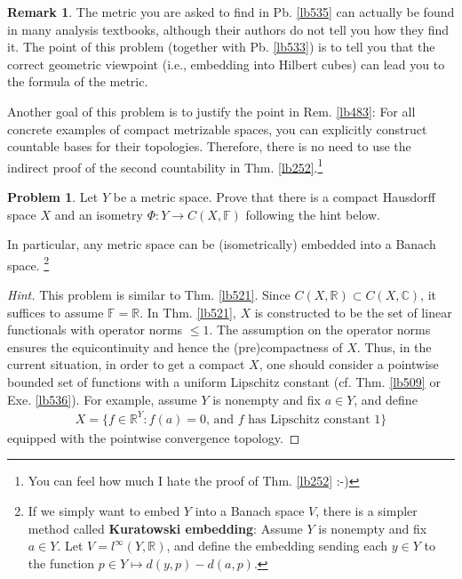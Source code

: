 \documentclass[12pt,b5paper,notitlepage]{article}
\theoremstyle{definition}
\newtheorem{exe}[df]{Exercise}
\newtheorem{rem}[df]{Remark}
\newtheorem{prob}{\color{red}Problem}[section]
\theoremstyle{plain}
\newcommand{\Cbb}{\mathbb C}
\newcommand{\Rbb}{\mathbb R}
\newcommand{\Fbb}{\mathbb F}
\numberwithin{equation}{section}
\begin{document}
\begin{rem}
The metric you are asked to find in Pb. \ref{lb535} can actually be found in many analysis textbooks, although their authors do not tell you how they find it. The point of this problem (together with Pb. \ref{lb533}) is to tell you that the correct geometric viewpoint (i.e., embedding into Hilbert cubes) can lead you to the formula of the metric. 

Another goal of this problem is to justify the point in Rem. \ref{lb483}: For all concrete examples of compact metrizable spaces, you can explicitly construct countable bases for their topologies. Therefore, there is no need to use the indirect proof of the second countability in Thm. \ref{lb252}.\footnote{You can feel how much I hate the proof of Thm. \ref{lb252} :-)}  \hfill\qedsymbol
\end{rem}





\begin{comment}
\begin{exe}
Let $f:X\rightarrow Y$ be a continuous map of topological spaces. Show that if $X$ is separable, then $f(X)$ is separable. (This property is not true if ``separable" is replaced by ``second countable".)
\end{exe}
\end{comment}

\begin{prob}\label{lb537}
Let $Y$ be a metric space. Prove that there is a compact Hausdorff space $X$ and an isometry $\Phi:Y\rightarrow C(X,\Fbb)$ following the hint below. 
\end{prob}

In particular, any metric space can be (isometrically) embedded into a Banach space. \footnote{If we simply want to embed $Y$ into a Banach space $V$, there is a simpler method called \textbf{Kuratowski embedding}: Assume $Y$ is nonempty and fix $a\in Y$. Let $V=l^\infty(Y,\Rbb)$, and define the embedding sending each $y\in Y$ to the function $p\in Y\mapsto d(y,p)-d(a,p)$.}

\begin{proof}[Hint]
This problem is similar to Thm. \ref{lb521}. Since $C(X,\Rbb)\subset C(X,\Cbb)$, it suffices to assume $\Fbb=\Rbb$. In  Thm. \ref{lb521}, $X$ is constructed to be the set of linear functionals with operator norms $\leq 1$. The assumption on the operator norms ensures the equicontinuity and hence the (pre)compactness of $X$. Thus, in the current situation, in order to get a compact $X$, one should consider a pointwise bounded set of functions with a uniform Lipschitz constant  (cf. Thm. \ref{lb509} or Exe. \ref{lb536}). For example, assume $Y$ is nonempty and fix $a\in Y$, and define
\begin{align}\label{eq212}
X=\{f\in \Rbb^Y:f(a)=0\text{, and $f$ has Lipschitz constant }1\}
\end{align}
equipped with the pointwise convergence topology.
\end{proof}
\end{document}
